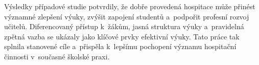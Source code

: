 Výsledky případové studie potvrdily, že dobře provedená hospitace může přinést významné zlepšení výuky, zvýšit zapojení studentů a~podpořit profesní rozvoj učitelů. Diferencovaný přístup k~žákům, jasná struktura výuky a~pravidelná zpětná vazba se ukázaly jako klíčové prvky efektivní výuky. Tato práce tak splnila stanovené cíle a~přispěla k~lepšímu pochopení významu hospitační činnosti v~současné školské praxi.
